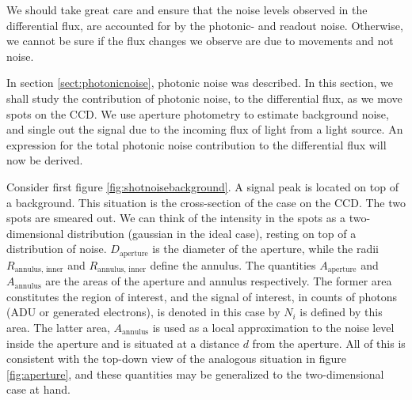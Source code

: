 \documentclass[../main.tex]{subfiles}
\begin{document}
We should take great care and ensure that the noise levels observed in the differential flux, are accounted for by the photonic- and readout noise. Otherwise, we cannot be sure if the flux changes we observe are due to movements and not noise.

In section \ref{sect:photonicnoise}, photonic noise was described. In this section, we shall study the contribution of photonic noise, to the differential flux, as we move spots on the CCD. We use aperture photometry to estimate background noise, and single out the signal due to the incoming flux of light from a light source. An expression for the total photonic noise contribution to the differential flux will now be derived. 

Consider first figure \ref{fig:shotnoisebackground}. A signal peak is located on top of a background. This situation is the cross-section of the case on the CCD. The two spots are smeared out. We can think of the intensity in the spots as a two-dimensional distribution (gaussian in the ideal case), resting on top of a distribution of noise. $D_\text{aperture}$ is the diameter of the aperture, while the radii $R_\text{annulus, inner}$ and $R_\text{annulus, inner}$ define the annulus. The quantities $A_\text{aperture}$ and $A_\text{annulus}$ are the areas of the aperture and annulus respectively. The former area constitutes the region of interest, and the signal of interest, in counts of photons (ADU or generated electrons), is denoted in this case by $N_i$ is defined by this area. The latter area, $A_\text{annulus}$ is used as a local approximation to the noise level inside the aperture and is situated at a distance $d$ from the aperture. All of this is consistent with the top-down view of the analogous situation in figure 
\ref{fig:aperture}, and these quantities may be generalized to the two-dimensional case at hand. 
\end{document}
